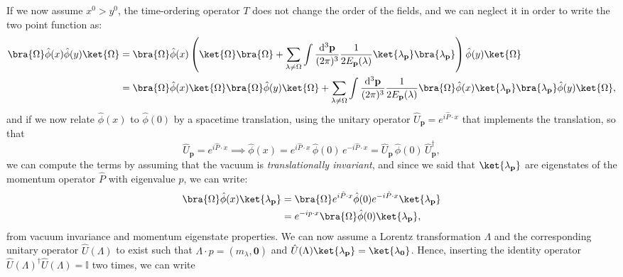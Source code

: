 If we now assume \(x^0 > y^0\), the time-ordering operator \(T\) does not change the order of the fields, and we can neglect it in order to write the two point function as:
\[
    \begin{aligned}
        \bra{\Omega} \hat{\phi}(x) \hat{\phi}(y) \ket{\Omega} & = \bra{\Omega} \hat{\phi}(x) \left( \ket{\Omega}\bra{\Omega} + \sum_{\lambda \neq \Omega} \int \frac{\mathrm{d}^3 \mathbf{p}}{(2\pi)^3} \frac{1}{2E_{\mathbf{p}}(\lambda)} \ket{\lambda_{\mathbf{p}}} \bra{\lambda_{\mathbf{p}}} \right) \hat{\phi}(y) \ket{\Omega}                                          \\
                                                              & = \bra{\Omega} \hat{\phi}(x) \ket{\Omega} \bra{\Omega} \hat{\phi}(y) \ket{\Omega} + \sum_{\lambda \neq \Omega} \int \frac{\mathrm{d}^3 \mathbf{p}}{(2\pi)^3} \frac{1}{2E_{\mathbf{p}}(\lambda)} \bra{\Omega} \hat{\phi}(x) \ket{\lambda_{\mathbf{p}}} \bra{\lambda_{\mathbf{p}}} \hat{\phi}(y) \ket{\Omega},
    \end{aligned}
\]
and if we now relate \(\hat{\phi}(x)\) to \(\hat{\phi}(0)\) by a spacetime translation, using the unitary operator \(\hat{U}_{\mathbf{p}} = e^{i \hat{P} \cdot x}\) that implements the translation, so that
\[
    \hat{U}_{\mathbf{p}} = e^{i \hat{P} \cdot x} \implies \hat{\phi}(x) = e^{i \hat{P} \cdot x} \,\hat{\phi}(0)\, e^{-i \hat{P} \cdot x} = \hat{U}_{\mathbf{p}} \, \hat{\phi}(0) \, \hat{U}_{\mathbf{p}}^{\dagger},
\]
we can compute the terms by assuming that the vacuum is \textit{translationally invariant}, and since we said that \(\ket{\lambda_{\mathbf{p}}}\) are eigenstates of the momentum operator \(\hat{P}\) with eigenvalue \(p\), we can write:
\[
    \begin{aligned}
        \bra{\Omega} \hat{\phi}(x) \ket{\lambda_{\mathbf{p}}} & = \bra{\Omega} e^{i \hat{P} \cdot x} \hat{\phi}(0) e^{-i \hat{P} \cdot x} \ket{\lambda_{\mathbf{p}}} \\
                                                              & = e^{-ip \cdot x}\bra{\Omega} \hat{\phi}(0) \ket{\lambda_{\mathbf{p}}},
    \end{aligned}
\]
from vacuum invariance and momentum eigenstate properties. We can now assume a Lorentz transformation \(\Lambda\) and the corresponding unitary operator \(\hat{U}(\Lambda)\) to exist such that \(\Lambda \cdot p = (m_\lambda, \mathbf{0})\) and \(\hat{U}(\Lambda) \ket{\lambda_{\mathbf{p}}} = \ket{\lambda_{\mathbf{0}}}\). Hence, inserting the identity operator \(\hat{U}(\Lambda)^{\dagger} \hat{U}(\Lambda) = \mathbb{I}\) two times, we can write
